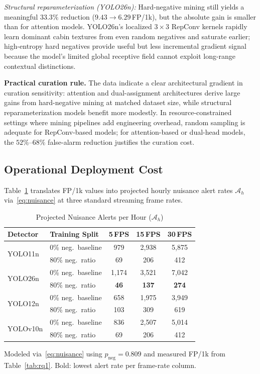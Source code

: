 \documentclass[conference]{IEEEtran}
\begin{document}
\noindent\textit{Structural reparameterization (YOLO26n):}
Hard-negative mining still yields a meaningful $33.3\%$ reduction
($9.43 \to 6.29$\,FP/1k), but the absolute gain is smaller than
for attention models. YOLO26n's localized $3{\times}3$ RepConv
kernels rapidly learn dominant cabin textures from even random
negatives and saturate earlier; high-entropy hard negatives provide
useful but less incremental gradient signal because the model's
limited global receptive field cannot exploit long-range contextual
distinctions.

\noindent\textbf{Practical curation rule.}
The data indicate a clear architectural gradient in curation
sensitivity: attention and dual-assignment architectures derive large
gains from hard-negative mining at matched dataset size, while
structural reparameterization models benefit more modestly. In
resource-constrained settings where mining pipelines add engineering
overhead, random sampling is adequate for RepConv-based models;
for attention-based or dual-head models, the $52\%$--$68\%$
false-alarm reduction justifies the curation cost.

\subsection{Operational Deployment Cost}
\label{subsec:cost_results}

Table~\ref{tab:deployment} translates FP/1k values into projected
hourly nuisance alert rates $\mathcal{A}_h$ via~\eqref{eq:nuisance}
at three standard streaming frame rates.

\begin{table}[t]
\caption{Projected Nuisance Alerts per Hour ($\mathcal{A}_h$)}
\label{tab:deployment}
\centering
\setlength{\tabcolsep}{5pt}
\begin{tabular}{llccc}
\toprule
\textbf{Detector} & \textbf{Training Split} &
\textbf{5\,FPS} & \textbf{15\,FPS} & \textbf{30\,FPS} \\
\midrule
\multirow{2}{*}{YOLO11n}
& 0\% neg.\ baseline  & 979   & 2{,}938 & 5{,}875 \\
& 80\% neg.\ ratio    & 69    & 206     & 412     \\
\midrule
\multirow{2}{*}{YOLO26n}
& 0\% neg.\ baseline  & 1{,}174 & 3{,}521 & 7{,}042 \\
& 80\% neg.\ ratio    & \textbf{46} & \textbf{137} & \textbf{274} \\
\midrule
\multirow{2}{*}{YOLO12n}
& 0\% neg.\ baseline  & 658   & 1{,}975 & 3{,}949 \\
& 80\% neg.\ ratio    & 103   & 309     & 619     \\
\midrule
\multirow{2}{*}{YOLOv10n}
& 0\% neg.\ baseline  & 836   & 2{,}507 & 5{,}014 \\
& 80\% neg.\ ratio    & 69    & 206     & 412     \\
\bottomrule
\end{tabular}
\vspace{1pt}
{\footnotesize Modeled via~\eqref{eq:nuisance} using
$p_{\mathrm{neg}}{=}0.809$ and measured FP/1k from Table~\ref{tab:rq1}. Bold: lowest alert rate per frame-rate column.}
\end{table}
\end{document}
